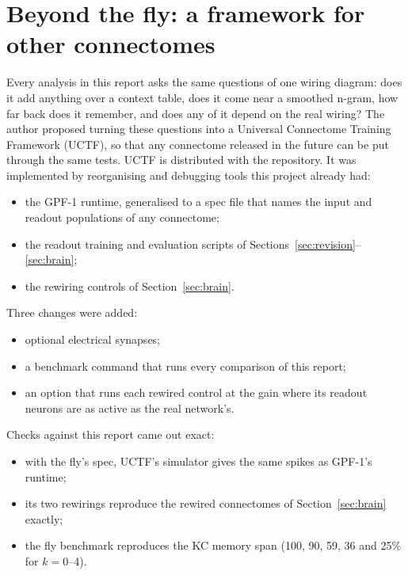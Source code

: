 \documentclass[conference]{IEEEtran}
\begin{document}
\section{Beyond the fly: a framework for other connectomes}\label{sec:uctf}
Every analysis in this report asks the same questions of one wiring diagram:
does it add anything over a context table, does it come near a smoothed
n-gram, how far back does it remember, and does any of it depend on the real
wiring? The author proposed turning these questions into a Universal Connectome
Training Framework (UCTF), so that any connectome released in the future can be
put through the same tests. UCTF is distributed with the repository. It was
implemented by reorganising and debugging tools this project already had:

\begin{itemize}
\item the GPF-1 runtime, generalised to a spec file that names the input and
readout populations of any connectome;
\item the readout training and evaluation scripts of
Sections~\ref{sec:revision}--\ref{sec:brain};
\item the rewiring controls of Section~\ref{sec:brain}.
\end{itemize}

Three changes were added:
\begin{itemize}
\item optional electrical synapses;
\item a benchmark command that runs every comparison of this report;
\item an option that runs each rewired control at the gain where its readout
neurons are as active as the real network's.
\end{itemize}

Checks against this report came out exact:
\begin{itemize}
\item with the fly's spec, UCTF's simulator gives the same spikes as GPF-1's
runtime;
\item its two rewirings reproduce the rewired connectomes of
Section~\ref{sec:brain} exactly;
\item the fly benchmark reproduces the KC memory span (100, 90, 59, 36 and
25\% for $k=0$--4).
\end{itemize}
\end{document}
